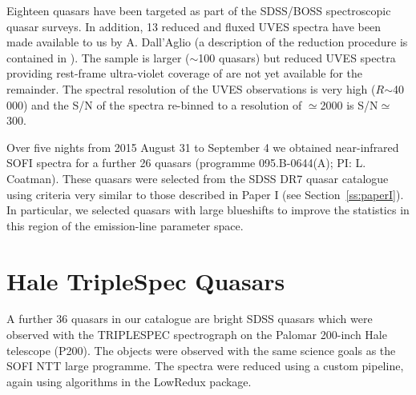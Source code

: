 Eighteen quasars have been targeted as part of the SDSS/BOSS spectroscopic quasar surveys.
In addition, 13 reduced and fluxed UVES spectra have been made available to us by A. Dall'Aglio (a description of the reduction procedure is contained in \citet{dallaglio08}).
The sample is larger ($\sim$100 quasars) but reduced UVES spectra providing rest-frame ultra-violet coverage of  are not yet available for the remainder. 
The spectral resolution of the UVES observations is very high ($R$$\sim$40\,000) and the S/N of the spectra re-binned to a resolution of $\simeq$2000 is S/N$\simeq$300. 

Over five nights from 2015 August 31 to September 4 we obtained near-infrared SOFI spectra for a further 26 quasars (programme 095.B-0644(A); PI: L. Coatman). 
These quasars were selected from the SDSS DR7 quasar catalogue using criteria very similar to those described in Paper I (see Section~\ref{ss:paperI}). 
In particular, we selected quasars with large  blueshifts to improve the statistics in this region of the  emission-line parameter space. 

\section{Hale TripleSpec Quasars}

A further 36 quasars in our catalogue are bright SDSS quasars which were observed with the TRIPLESPEC spectrograph on the Palomar 200-inch Hale telescope (P200). 
The objects were observed with the same science goals as the SOFI NTT large programme. 
The spectra were reduced using a custom pipeline, again using algorithms in the LowRedux package. 


